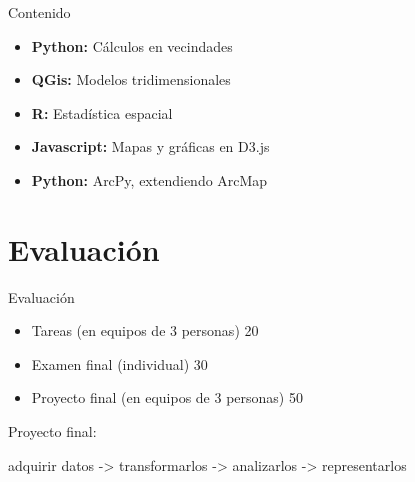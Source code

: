 \documentclass[10pt]{beamer}
\begin{document}
\begin{frame}{Contenido}

  \begin{itemize}
  \item \textbf{Python:} Cálculos en vecindades 
  \item \textbf{QGis:} Modelos tridimensionales
  \item \textbf{R:} Estadística espacial
  \item \textbf{Javascript:} Mapas y gráficas en D3.js
  \item \textbf{Python:} ArcPy, extendiendo ArcMap
  \end{itemize}

\end{frame}


\section{Evaluación}

\begin{frame}{Evaluación}

  \begin{itemize}
  \item Tareas (en equipos de 3 personas) 20%
  \item Examen final (individual) 30%
  \item Proyecto final (en equipos de 3 personas) 50%
  \end{itemize}\pause

  \begin{block}{}
    Proyecto final:

    adquirir datos -> transformarlos -> analizarlos -> representarlos
  \end{block}

\end{frame}
\end{document}
